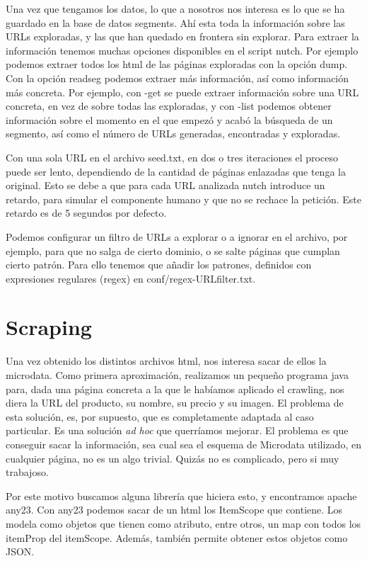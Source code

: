 \documentclass[a4paper]{article}
\begin{document}
Una vez que tengamos los datos, lo que a nosotros nos interesa es lo que se ha guardado en la base de datos segments. Ahí esta toda la información sobre las URLs exploradas, y las que han quedado en frontera sin explorar. Para extraer la información tenemos muchas opciones disponibles en el script nutch. Por ejemplo podemos extraer todos los html de las páginas exploradas con la opción dump. Con la opción readseg podemos extraer más información, así como información más concreta. Por ejemplo, con -get se puede extraer información sobre una URL concreta, en vez de sobre todas las exploradas, y con -list podemos obtener información sobre el momento en el que empezó y acabó la búsqueda de un segmento, así como el número de URLs generadas, encontradas y exploradas. 

Con una sola URL en el archivo seed.txt, en dos o tres iteraciones el proceso puede ser lento, dependiendo de la cantidad de páginas enlazadas que tenga la original. Esto se debe a que para cada URL analizada nutch introduce un retardo, para simular el componente humano y que no se rechace la petición. Este retardo es de 5 segundos por defecto.

Podemos configurar un filtro de URLs a explorar o a ignorar en el archivo, por ejemplo, para que no salga de cierto dominio, o se salte páginas que cumplan cierto patrón. Para ello tenemos que añadir los patrones, definidos con expresiones regulares (regex) en conf/regex-URLfilter.txt.

\section{Scraping}

Una vez obtenido los distintos archivos html, nos interesa sacar de ellos la microdata. Como primera aproximación, realizamos un pequeño programa java para, dada una página concreta a la que le habíamos aplicado el crawling, nos diera la URL del producto, su nombre, su precio y su imagen. El problema de esta solución, es, por supuesto, que es completamente adaptada al caso particular. Es una solución \textit{ad hoc} que querríamos mejorar. El problema es que conseguir sacar la información, sea cual sea el esquema de Microdata utilizado, en cualquier página, no es un algo trivial. Quizás no es complicado, pero si muy trabajoso. 

Por este motivo buscamos alguna librería que hiciera esto, y encontramos apache any23. Con any23 podemos sacar de un html los ItemScope que contiene. Los modela como objetos que tienen como atributo, entre otros, un map con todos los itemProp del itemScope. Además, también permite obtener estos objetos como JSON.
\end{document}

